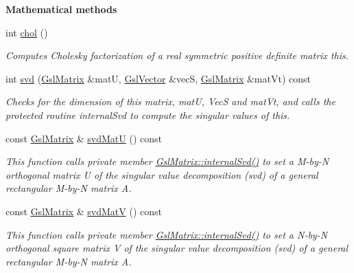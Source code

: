 \begin{Indent}{\bf Mathematical methods}\par
\begin{DoxyCompactItemize}
\item 
int \hyperlink{class_q_u_e_s_o_1_1_gsl_matrix_a6b623c4d564b327adf2a51138ad91372}{chol} ()
\begin{DoxyCompactList}\small\item\em Computes Cholesky factorization of a real symmetric positive definite matrix {\ttfamily this}. \end{DoxyCompactList}\item 
int \hyperlink{class_q_u_e_s_o_1_1_gsl_matrix_a969f83e4d889e7d627055dae52968573}{svd} (\hyperlink{class_q_u_e_s_o_1_1_gsl_matrix}{Gsl\-Matrix} \&mat\-U, \hyperlink{class_q_u_e_s_o_1_1_gsl_vector}{Gsl\-Vector} \&vec\-S, \hyperlink{class_q_u_e_s_o_1_1_gsl_matrix}{Gsl\-Matrix} \&mat\-Vt) const 
\begin{DoxyCompactList}\small\item\em Checks for the dimension of {\ttfamily this} matrix, {\ttfamily mat\-U}, {\ttfamily Vec\-S} and {\ttfamily mat\-Vt}, and calls the protected routine {\ttfamily internal\-Svd} to compute the singular values of {\ttfamily this}. \end{DoxyCompactList}\item 
const \hyperlink{class_q_u_e_s_o_1_1_gsl_matrix}{Gsl\-Matrix} \& \hyperlink{class_q_u_e_s_o_1_1_gsl_matrix_a9a568cbcdc9e69b05e1b76941b9eeb2b}{svd\-Mat\-U} () const 
\begin{DoxyCompactList}\small\item\em This function calls private member \hyperlink{class_q_u_e_s_o_1_1_gsl_matrix_a971c0fcee50b741419f4f2322329647f}{Gsl\-Matrix\-::internal\-Svd()} to set a M-\/by-\/\-N orthogonal matrix U of the singular value decomposition (svd) of a general rectangular M-\/by-\/\-N matrix A. \end{DoxyCompactList}\item 
const \hyperlink{class_q_u_e_s_o_1_1_gsl_matrix}{Gsl\-Matrix} \& \hyperlink{class_q_u_e_s_o_1_1_gsl_matrix_a5d0b3ae61abb3fb09a4e653983514d8b}{svd\-Mat\-V} () const 
\begin{DoxyCompactList}\small\item\em This function calls private member \hyperlink{class_q_u_e_s_o_1_1_gsl_matrix_a971c0fcee50b741419f4f2322329647f}{Gsl\-Matrix\-::internal\-Svd()} to set a N-\/by-\/\-N orthogonal square matrix V of the singular value decomposition (svd) of a general rectangular M-\/by-\/\-N matrix A. \end{DoxyCompactList}\item 

\end{DoxyCompactItemize}
\end{Indent}
